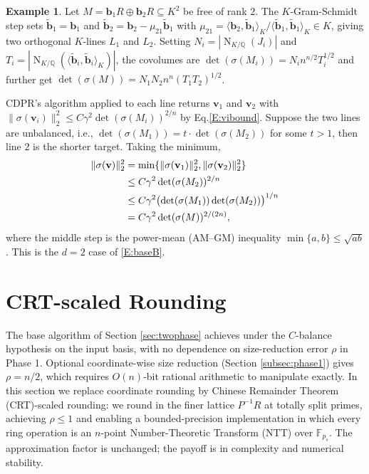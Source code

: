 \documentclass[11pt,a4paper]{article}
\theoremstyle{plain}
\theoremstyle{definition}
\newtheorem{example}[theorem]{Example}
\theoremstyle{remark}
\DeclareMathOperator{\Nm}{N}
\newcommand{\Q}{\mathbb{Q}}
\newcommand{\F}{\mathbb{F}}
\begin{document}
\begin{example}
\label{ex:rank2}
Let $M=\mathbf{b}_1 R\oplus\mathbf{b}_2 R\subseteq K^2$ be free of rank $2$. The $K$-Gram-Schmidt step sets $\tilde{\mathbf{b}}_1=\mathbf{b}_1$ and $\tilde{\mathbf{b}}_2=\mathbf{b}_2-\mu_{21}\tilde{\mathbf{b}}_1$ with $\mu_{21}=\langle\mathbf{b}_2, \tilde{\mathbf{b}}_1\rangle_K/\langle\tilde{\mathbf{b}}_1, \tilde{\mathbf{b}}_1\rangle_K\in K$, giving two orthogonal $K$-lines $L_1$ and $L_2$. Setting $N_i=|\Nm_{K/\Q}(J_i)|$ and $T_i=|\Nm_{K/\Q}(\langle\tilde{\mathbf{b}}_i, \tilde{\mathbf{b}}_i\rangle_K)|$, the covolumes are $\det(\sigma(M_i))=N_i n^{n/2} T_i^{1/2}$ and further get 
$\det(\sigma(M))=N_1N_2 n^{n} (T_1T_2)^{1/2}$.

CDPR's algorithm applied to each line returns $\mathbf{v}_1$ and $\mathbf{v}_2$ with $\|\sigma(\mathbf{v}_i)\|_2^2\le C\gamma^2\det(\sigma(M_i))^{2/n}$ by Eq.\eqref{E:vibound}. Suppose the two lines are unbalanced, i.e., $\det(\sigma(M_1))=t\cdot\det(\sigma(M_2))$ for some $t>1$, then line $2$ is the shorter target. Taking the minimum,
\begin{align}
  \|\sigma(\mathbf{v})\|_2^2
  &=\min\{\|\sigma(\mathbf{v}_1)\|_2^2,\|\sigma(\mathbf{v}_2)\|_2^2\}
\notag
  \\
  &\le C\gamma^2\det(\sigma(M_2))^{2/n}\notag
  \\
  &\le C\gamma^2\bigl(\det(\sigma(M_1))\det(\sigma(M_2))\bigr)^{1/n}
 \notag
  \\
  &=C\gamma^2\det(\sigma(M))^{2/(2n)},
\end{align}
where the middle step is the power-mean (AM--GM) inequality $\min\{a,b\}\le\sqrt{ab}$. This is the $d=2$ case of \eqref{E:baseB}.
\end{example}

\section{CRT-scaled Rounding}\label{sec:crt}

The base algorithm of Section \ref{sec:twophase} achieves under the $C$-balance hypothesis on the input basis, with no dependence on size-reduction error $\rho$ in Phase 1. Optional coordinate-wise size reduction (Section \ref{subsec:phase1}) gives $\rho=n/2$, which requires $O(n)$-bit rational arithmetic to manipulate exactly. In this section we replace coordinate rounding by Chinese Remainder Theorem (CRT)-scaled rounding: we round in the finer lattice $P^{-1}R$ at totally split primes, achieving $\rho\le 1$ and enabling a bounded-precision implementation in which every ring operation is an $n$-point Number-Theoretic Transform (NTT) over $\F_{p_s}$. The approximation factor is unchanged; the payoff is in complexity and numerical stability.
\end{document}
